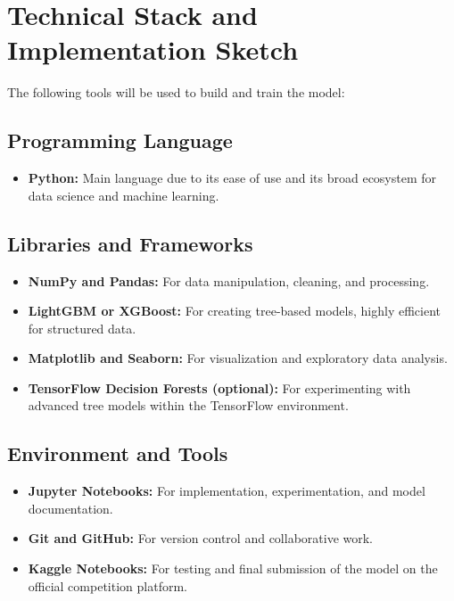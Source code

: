 \documentclass{article}
\begin{document}
\section{Technical Stack and Implementation Sketch}

The following tools will be used to build and train the model:

\subsection*{Programming Language}
\begin{itemize}
  \item \textbf{Python:} Main language due to its ease of use and its broad ecosystem for data science and machine learning.
\end{itemize}

\subsection*{Libraries and Frameworks}
\begin{itemize}
  \item \textbf{NumPy and Pandas:} For data manipulation, cleaning, and processing.
  \item \textbf{LightGBM or XGBoost:} For creating tree-based models, highly efficient for structured data.
  \item \textbf{Matplotlib and Seaborn:} For visualization and exploratory data analysis.
  \item \textbf{TensorFlow Decision Forests (optional):} For experimenting with advanced tree models within the TensorFlow environment.
\end{itemize}

\subsection*{Environment and Tools}
\begin{itemize}
  \item \textbf{Jupyter Notebooks:} For implementation, experimentation, and model documentation.
  \item \textbf{Git and GitHub:} For version control and collaborative work.
  \item \textbf{Kaggle Notebooks:} For testing and final submission of the model on the official competition platform.
\end{itemize}
\end{document}

